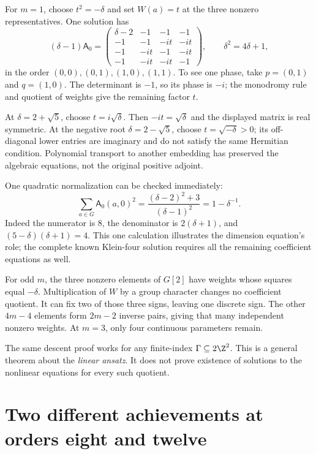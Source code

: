 \begin{example}
For $m=1$, choose $t^2=-\delta$ and set $W(a)=t$ at the three
nonzero representatives. One solution has
\[
 (\delta-1)\mathsf A_0=
 \begin{pmatrix}
 \delta-2&-1&-1&-1\\
 -1&-1&-it&-it\\
 -1&-it&-1&-it\\
 -1&-it&-it&-1
 \end{pmatrix},\qquad \delta^2=4\delta+1,
\]
in the order $(0,0),(0,1),(1,0),(1,1)$. To see one phase,
take $p=(0,1)$ and $q=(1,0)$. The determinant is $-1$,
so its phase is $-i$; the monodromy rule and quotient of weights
give the remaining factor $t$.

At $\delta=2+\sqrt5$, choose $t=i\sqrt\delta$. Then
$-it=\sqrt\delta$ and the displayed matrix is real symmetric.
At the negative root $\delta=2-\sqrt5$, choose
$t=\sqrt{-\delta}>0$; its off-diagonal lower entries are
imaginary and do not satisfy the same Hermitian condition.
Polynomial transport to another embedding has preserved the
algebraic equations, not the original positive adjoint.

One quadratic normalization can be checked immediately:
\[
 \sum_{a\in G}\mathsf A_0(a,0)^2
 =\frac{(\delta-2)^2+3}{(\delta-1)^2}
 =1-\delta^{-1}.
\]
Indeed the numerator is $8$, the denominator is $2(\delta+1)$,
and $(5-\delta)(\delta+1)=4$. This one calculation illustrates
the dimension equation's role; the complete known Klein-four
solution requires all the remaining coefficient equations as well.
\end{example}

For odd $m$, the three nonzero elements of $G[2]$ have weights
whose squares equal $-\delta$. Multiplication of $W$ by a group
character changes no coefficient quotient. It can fix two of those
three signs, leaving one discrete sign. The other $4m-4$ elements
form $2m-2$ inverse pairs, giving that many independent nonzero
weights. At $m=3$, only four continuous parameters remain.

The same descent proof works for any finite-index
$\Gamma\subseteq2\Z^2$. This is a general theorem about the
\emph{linear ansatz}. It does not prove existence of solutions
to the nonlinear equations for every such quotient.

\section{Two different achievements at orders eight and twelve}

